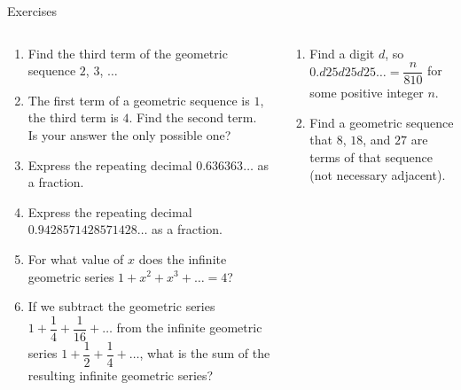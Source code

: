 \documentclass[9pt,aspectratio=169]{beamer}
\begin{document}
\begin{frame}{Exercises}
  \begin{columns}[T]
    \begin{column}{0.5\textwidth}
      \begin{enumerate}
        \item Find the third term of the geometric sequence $2$, $3$, $\ldots$
        \item The first term of a geometric sequence is $1$, the third term is $4$. Find the second term. Is your answer the only possible one?
        \item Express the repeating decimal $0.636363\ldots$ as a fraction.
        \item Express the repeating decimal $0.9428571428571428\ldots$ as a fraction.
        \item For what value of $x$ does the infinite geometric series $1 + x^2 + x^3 + \ldots = 4$?
        \item If we subtract the geometric series $1 + \dfrac{1}{4} + \dfrac{1}{16} + \ldots$ from the infinite geometric series $1 + \dfrac{1}{2} + \dfrac{1}{4} + \ldots$, what is the sum of the resulting infinite geometric series?
        \seti
      \end{enumerate}
    \end{column}
    \begin{column}{0.5\textwidth}
      \begin{enumerate}
        \conti
        \item Find a digit $d$, so $0.d25d25d25\ldots = \dfrac{n}{810}$ for some positive integer $n$.
        \item Find a geometric sequence that $8$, $18$, and $27$ are terms of that sequence (not necessary adjacent).
      \end{enumerate}
    \end{column}
  \end{columns}
\end{frame}
\end{document}
